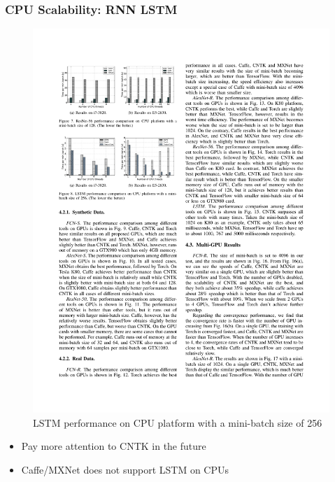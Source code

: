 
\begin{frame}
	\MyLogo
	\frametitle{CPU Scalability: RNN LSTM}  
\vskip -5pt
	\begin{figure}[htbp] 
		\includegraphics[width=\linewidth]{figures/LSTM1.pdf} 
		\caption{LSTM performance on CPU platform with a mini-batch size of 256}
	\end{figure}

\pause
	
\vskip -12pt
\begin{mdframed}[style=mystyle1]
\begin{itemize}
\item Pay more attention to CNTK in the future
\item Caffe/MXNet does not support LSTM on CPUs
\end{itemize}
\end{mdframed}

\end{frame}

